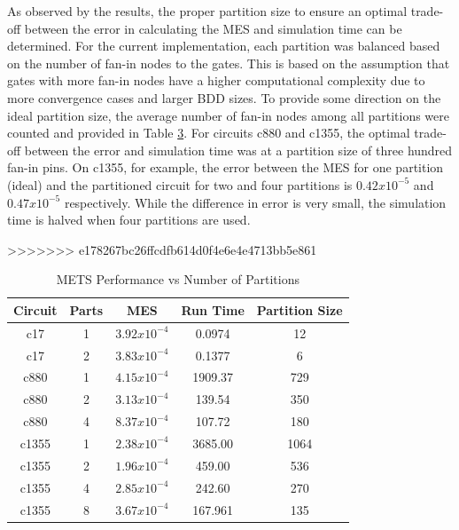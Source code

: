 \documentclass[conference]{IEEEtran}
\begin{document}
\begin{algorithm}
\begin{table}[ht]
\begin{center}
\begin{table}[ht]
\begin{center}
As observed by the results, the proper partition size to ensure an optimal trade-off between the error in calculating the MES and simulation time can be determined. For the current implementation, each partition was balanced based on the number of fan-in nodes to the gates. This is based on the assumption that gates with more fan-in nodes have a higher computational complexity due to more convergence cases and larger BDD sizes. To provide some direction on the ideal partition size, the average number of fan-in nodes among all partitions were counted and provided in Table \ref{table:restable}. For circuits c880 and c1355, the optimal trade-off between the error and simulation time was at a partition size of three hundred fan-in pins. On c1355, for example, the error between the MES for one partition (ideal) and the partitioned circuit for two and four partitions is $0.42x10^{-5}$ and $0.47x10^{-5}$ respectively. While the difference in error is very small, the simulation time is halved when four partitions are used. 

\begin{table}[ht]
	\begin{center}
		\caption{METS Performance vs Number of Partitions}
>>>>>>> e178267bc26ffcdfb614d0f4e6e4e4713bb5e861
		\label{table:restable}
		\begin{tabular}{|c|c|c|c|c|}
			\hline
			Circuit& Parts & MES & Run Time & Partition Size\\ 
			\hline
			c17 & 1 & $3.92x10^{-4}$ & 0.0974 & 12\\
			\hline
			c17 & 2 & $3.83x10^{-4}$ & 0.1377 & 6\\
			\hline
			c880 & 1 & $4.15x10^{-4}$ & 1909.37 & 729\\
			\hline
			c880 & 2 & $3.13x10^{-4}$ & 139.54 & 350\\
			\hline
			c880 & 4 & $8.37x10^{-4}$ & 107.72 & 180\\
			\hline
			c1355 & 1 & $2.38x10^{-4}$ & 3685.00 & 1064\\
			\hline
			c1355 & 2 & $1.96x10^{-4}$ & 459.00 & 536\\
			\hline
			c1355 & 4 & $2.85x10^{-4}$ & 242.60 & 270\\
			\hline
			c1355 & 8 & $3.67x10^{-4}$ & 167.961 & 135\\
			\hline
		\end{tabular}
	\end{center}
\end{table}


\end{center}
\end{table}
\end{center}
\end{table}
\end{algorithm}
\end{document}
